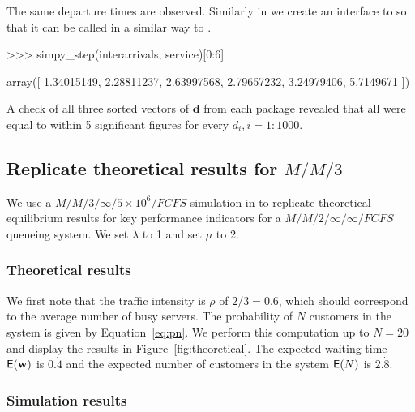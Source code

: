 \documentclass[article]{jss}
\begin{document}
%
The same departure times are observed. Similarly in 
we create an interface to  so that it can be called in a
similar way to .
%
\begin{CodeChunk}
\begin{CodeInput}
>>> simpy_step(interarrivals, service)[0:6]
\end{CodeInput}
\begin{CodeOutput}
array([ 1.34015149,  2.28811237,  2.63997568,  2.79657232,  3.24979406, 
	5.7149671 ])
\end{CodeOutput}
\end{CodeChunk}
%
A check of all three sorted vectors of $\mathbf{d}$ from each package
revealed that all were equal to within 5 significant figures for every
$d_i, i = 1:1000$.

\subsection[Replicate theoretical results for M/M/3]{Replicate theoretical results for $M/M/3$}

We use a $M/M/3/\infty/5 \times 10^6/\mathit{FCFS}$ simulation in
 to replicate theoretical equilibrium results for
key performance indicators for a $M/M/2/\infty/\infty/\mathit{FCFS}$ queueing
system. We set $\lambda$ to 1 and set $\mu$ to 2.

\subsubsection{Theoretical results}

We first note that the traffic intensity is $\rho$ of
$2/3 = 0.\dot{6}$, which should correspond to the average number of
busy servers. The probability of $N$ customers in the system is given
by Equation~\ref{eq:pn}. We perform this computation up to $N = 20$
and display the results in Figure~\ref{fig:theoretical}. The expected
waiting time $\mathsf{E}(\mathbf{w})$ is $0.\dot{4}$ and the expected
number of customers in the system $\mathsf{E}(N)$ is $2.\dot{8}$.

\subsubsection{Simulation results}
\end{document}
